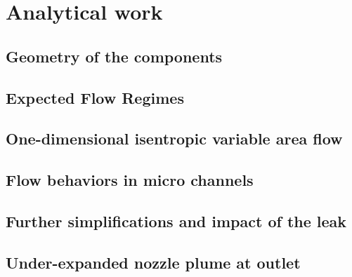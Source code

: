 \section{Analytical work}


\subsection{Geometry of the components}


\subsection{Expected Flow Regimes}
\label{sec:expected-flow-regimes}

\newpage

\subsection{One-dimensional isentropic variable area flow}
\label{sec:one-dim-isentropic}

\newpage

\subsection{Flow behaviors in micro channels}

\newpage

\subsection{Further simplifications and impact of the leak}

\newpage

\subsection{Under-expanded nozzle plume at outlet}

\newpage
